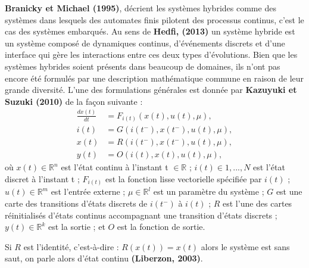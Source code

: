 \documentclass[12pt, oneside]{report} %
\newcommand{\R}{\mathbb{R}} %
\theoremstyle{definition}
\newtheorem{defn}{\textbf{Définition}}[section]
\theoremstyle{remark}
\begin{document}
	\textbf{Branicky et Michael (1995)}, décrient les systèmes hybrides comme des systèmes dans lesquels des automates finis pilotent des processus continus, c'est le cas des systèmes embarqués. Au sens de \textbf{Hedfi, (2013)} un système hybride est un système composé de dynamiques continus, d'événements discrets et d'une interface qui gère les interactions entre ces deux types d'évolutions. Bien que les systèmes hybrides soient présents dans beaucoup de domaines, ils n'ont pas encore été formulés par une description mathématique commune en raison de leur grande diversité. L'une des formulations générales est donnée par \textbf{Kazuyuki et Suzuki (2010)} de la façon suivante : 
\begin{align}
	\frac{dx(t)}{dt} &= F_{i(t)}\left(x(t), u(t), \mu \right), \\
	i(t) &= G(i(t^-), x(t^-), u(t), \mu), \\
	x(t) &= R(i(t^-), x(t^-), u(t), \mu),\\
	y(t) &= O(i(t), x(t), u(t), \mu), 
\end{align}
où $x(t) \in \R^n$ est l'état continu à l'instant t $\in \R$ ; $i(t) \in {1, ... , N} $ est l'état discret à l'instant t ; $F_{i(t)}$ est la fonction lisse vectorielle spécifiée par $i(t)$ ; $u(t) \in \R^m$ est l'entrée externe ; $\mu \in \R^l$ est un paramètre du système ; $G$ est une carte des transitions d'états discrets de $i(t^-)$ à $i(t)$ ; $R$ est l'une des cartes réinitialisés d'états continus accompagnant une transition d'états discrets ; $y(t) \in \R^k$ est la sortie ; et $O$ est la fonction de sortie.

Si $R$ est l'identité, c'est-à-dire : $R(x(t)) = x(t)$ alors le système est sans saut, on parle alors d'état continu \textbf{(Liberzon, 2003)}.

	
	
\end{document}
